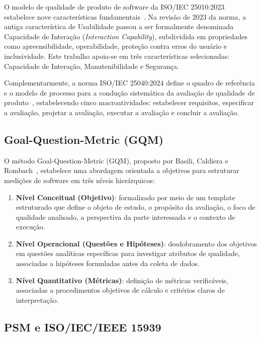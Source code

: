 \documentclass[journal]{IEEEtran}
\begin{document}
O modelo de qualidade de produto de software da ISO/IEC 25010:2023 estabelece nove características fundamentais~\cite{iso25010}. Na revisão de 2023 da norma, a antiga característica de Usabilidade passou a ser formalmente denominada Capacidade de Interação (\textit{Interaction Capability}), subdividida em propriedades como apreensibilidade, operabilidade, proteção contra erros do usuário e inclusividade. Este trabalho apoia-se em três características selecionadas: Capacidade de Interação, Manutenibilidade e Segurança.

Complementarmente, a norma ISO/IEC 25040:2024 define o quadro de referência e o modelo de processo para a condução sistemática da avaliação de qualidade de produto~\cite{iso25040}, estabelecendo cinco macroatividades: estabelecer requisitos, especificar a avaliação, projetar a avaliação, executar a avaliação e concluir a avaliação.

\subsection{Goal-Question-Metric (GQM)}
\label{sec:gqm}

O método Goal-Question-Metric (GQM), proposto por Basili, Caldiera e Rombach~\cite{basili1994gqm}, estabelece uma abordagem orientada a objetivos para estruturar medições de software em três níveis hierárquicos:

\begin{enumerate}
    \item \textbf{Nível Conceitual (Objetivo)}: formalizado por meio de um template estruturado que define o objeto de estudo, o propósito da avaliação, o foco de qualidade analisado, a perspectiva da parte interessada e o contexto de execução.
    \item \textbf{Nível Operacional (Questões e Hipóteses)}: desdobramento dos objetivos em questões analíticas específicas para investigar atributos de qualidade, associadas a hipóteses formuladas antes da coleta de dados.
    \item \textbf{Nível Quantitativo (Métricas)}: definição de métricas verificáveis, associadas a procedimentos objetivos de cálculo e critérios claros de interpretação.
\end{enumerate}

\subsection{PSM e ISO/IEC/IEEE 15939}
\label{sec:psm}
\end{document}
